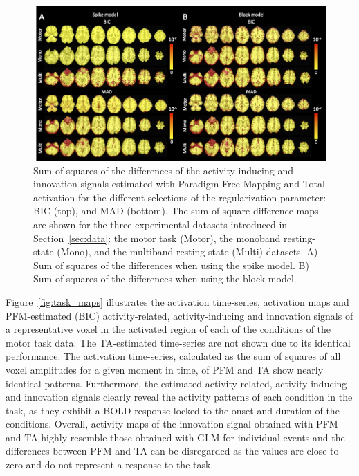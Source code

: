 \begin{figure}[t!]
    \begin{center}
        \includegraphics[width=\textwidth]{figures/comp_figure.png}
    \end{center}
    \caption{Sum of squares of the differences of the activity-inducing and innovation signals estimated with Paradigm Free Mapping and Total activation for the different selections of the regularization parameter: BIC (top), and MAD (bottom). The sum of square difference maps are shown for the three experimental datasets introduced in Section~\ref{sec:data}: the motor task (Motor), the monoband resting-state (Mono), and the multiband resting-state (Multi) datasets. A) Sum of squares of the differences when using the spike model. B) Sum of squares of the differences when using the block model.}
\label{fig:rss}
\end{figure}

Figure~\ref{fig:task_maps} illustrates the activation time-series, activation maps and PFM-estimated (BIC) activity-related, activity-inducing and innovation signals of a representative voxel in the activated region of each of the conditions of the motor task data. The TA-estimated time-series are not shown due to its identical performance. The activation time-series, calculated as the sum of squares of all voxel amplitudes for a given moment in time, of PFM and TA show nearly identical patterns. Furthermore, the estimated activity-related, activity-inducing and innovation signals clearly reveal the activity patterns of each condition in the task, as they exhibit a BOLD response locked to the onset and duration of the conditions. Overall, activity maps of the innovation signal obtained with PFM and TA highly resemble those obtained with GLM for individual events and the differences between PFM and TA can be disregarded as the values are close to zero and do not represent a response to the task.

